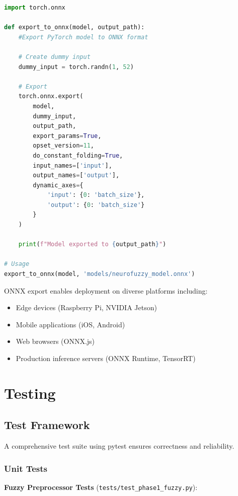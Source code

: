 \documentclass[12pt,a4paper]{report}
\begin{document}
\begin{lstlisting}[language=Python, caption={ONNX Export}]
import torch.onnx

def export_to_onnx(model, output_path):
    #Export PyTorch model to ONNX format
    
    # Create dummy input
    dummy_input = torch.randn(1, 52)
    
    # Export
    torch.onnx.export(
        model,
        dummy_input,
        output_path,
        export_params=True,
        opset_version=11,
        do_constant_folding=True,
        input_names=['input'],
        output_names=['output'],
        dynamic_axes={
            'input': {0: 'batch_size'},
            'output': {0: 'batch_size'}
        }
    )
    
    print(f"Model exported to {output_path}")

# Usage
export_to_onnx(model, 'models/neurofuzzy_model.onnx')
\end{lstlisting}

ONNX export enables deployment on diverse platforms including:
\begin{itemize}
    \item Edge devices (Raspberry Pi, NVIDIA Jetson)
    \item Mobile applications (iOS, Android)
    \item Web browsers (ONNX.js)
    \item Production inference servers (ONNX Runtime, TensorRT)
\end{itemize}

\section{Testing}

\subsection{Test Framework}

A comprehensive test suite using pytest ensures correctness and reliability.

\subsubsection{Unit Tests}

\textbf{Fuzzy Preprocessor Tests} (\texttt{tests/test\_phase1\_fuzzy.py}):
\end{document}
